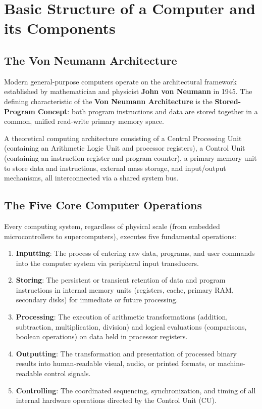 \section{Basic Structure of a Computer and its Components}

\subsection{The Von Neumann Architecture}

Modern general-purpose computers operate on the architectural framework established by mathematician and physicist \textbf{John von Neumann} in 1945. The defining characteristic of the \textbf{Von Neumann Architecture} is the \textbf{Stored-Program Concept}: both program instructions and data are stored together in a common, unified read-write primary memory space. 

\begin{definition}
A theoretical computing architecture consisting of a Central Processing Unit (containing an Arithmetic Logic Unit and processor registers), a Control Unit (containing an instruction register and program counter), a primary memory unit to store data and instructions, external mass storage, and input/output mechanisms, all interconnected via a shared system bus.
\end{definition}

\subsection{The Five Core Computer Operations}

Every computing system, regardless of physical scale (from embedded microcontrollers to supercomputers), executes five fundamental operations:

\begin{enumerate}[leftmargin=1.5em]
    \item \textbf{Inputting}: The process of entering raw data, programs, and user commands into the computer system via peripheral input transducers.
    \item \textbf{Storing}: The persistent or transient retention of data and program instructions in internal memory units (registers, cache, primary RAM, secondary disks) for immediate or future processing.
    \item \textbf{Processing}: The execution of arithmetic transformations (addition, subtraction, multiplication, division) and logical evaluations (comparisons, boolean operations) on data held in processor registers.
    \item \textbf{Outputting}: The transformation and presentation of processed binary results into human-readable visual, audio, or printed formats, or machine-readable control signals.
    \item \textbf{Controlling}: The coordinated sequencing, synchronization, and timing of all internal hardware operations directed by the Control Unit (CU).
\end{enumerate}

